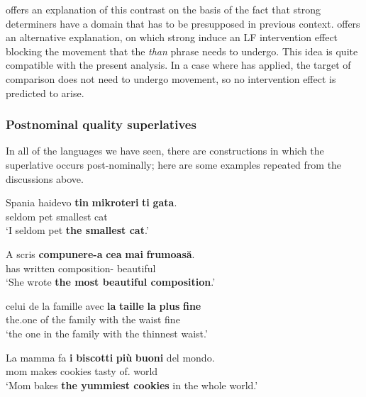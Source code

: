 \documentclass[output=paper
,modfonts
,nonflat]{langsci/langscibook}
\begin{document}
\z 

\z 

\citet{Beil1997} offers an explanation of this contrast on the basis of the fact that strong determiners have a domain that has to be presupposed in previous context. \citet{Xiang2005} offers an alternative explanation, on which strong  induce an LF intervention effect blocking the movement that the \textit{than} phrase needs to undergo. This idea is quite compatible with the present analysis. In a case where  has applied, the target of comparison does not need to undergo movement, so no intervention effect is predicted to arise.

\subsubsection{Postnominal quality superlatives}

In all of the languages we have seen, there are constructions in which the superlative occurs post-nominally; here are some examples repeated from the discussions above.

\ea \label{ex:coppockstrand:89}
\gll Spania haidevo \textbf{tin} \textbf{mikroteri} \textbf{ti} \textbf{gata}.  \\
seldom pet  smallest  cat\\ 
\glt `I seldom pet \textbf{the smallest cat}.'
\z

\ea \label{ex:coppockstrand:90}
\gll A scris \textbf{compunere-a} \textbf{cea} \textbf{mai} \textbf{frumoasă}.\\
has written composition-  \cmpr{} beautiful\\ 
\glt `She wrote \textbf{the most beautiful composition}.'
\z

\ea \label{ex:coppockstrand:91}
\gll celui de la famille avec \textbf{la} \textbf{taille} \textbf{la} \textbf{plus} \textbf{fine} \\ 
the.one of the family with the waist  \cmpr{} {fine}\\ 
\glt `the one in the family with the thinnest waist.'
\z

\ea \label{ex:coppockstrand:92}
\gll La mamma fa \textbf{i} \textbf{biscotti} \textbf{più} \textbf{buoni} del mondo.\\
 mom makes  cookies \cmpr{} tasty of. world\\ 
\glt `Mom bakes \textbf{the yummiest cookies} in the whole world.' 
\z
\end{document}
